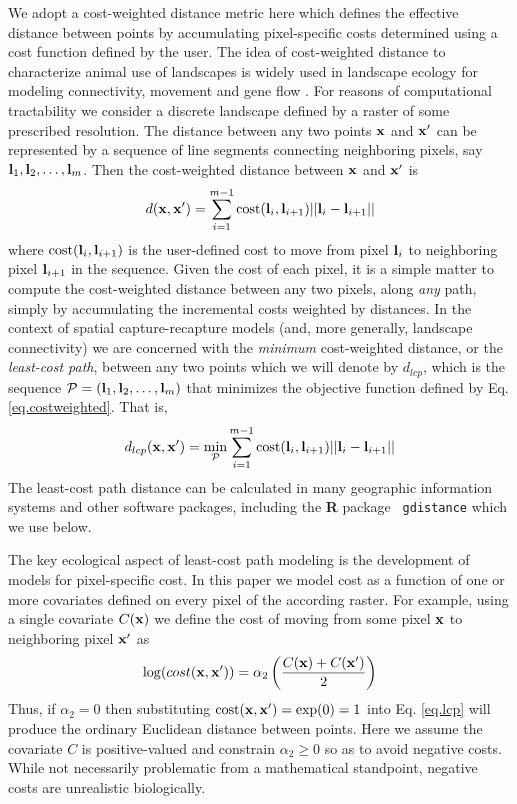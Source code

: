 We adopt a cost-weighted distance metric here which defines the
effective distance between points by accumulating pixel-specific costs
determined using a cost function defined by the user.  The idea of
cost-weighted distance to characterize animal use of landscapes is
widely used in landscape ecology for modeling connectivity, movement
and gene flow \citep{beier_etal:2008}. For reasons of computational
tractability we consider a discrete landscape defined by a raster of
some prescribed resolution. The distance between any two points ${\bf
  x}$ and ${\bf x}'$ can be represented by a sequence of line segments
connecting neighboring pixels, say ${\bf l}_{1},{\bf
  l}_{2},\ldots,{\bf l}_{m}$. Then the cost-weighted distance between
${\bf x}$ and ${\bf x}'$ is
\begin{equation}
 d({\bf x},{\bf x}')
  =  \sum_{i=1}^{m-1} \mbox{cost}({\bf l}_{i},{\bf l}_{i+1})||{\bf l}_{i} - {\bf l}_{i+1}||
\label{eq.costweighted}
\end{equation}
where $\mbox{cost}({\bf l}_{i},{\bf l}_{i+1})$ is the user-defined cost to
move from pixel ${\bf l}_{i}$ to neighboring pixel ${\bf l}_{i+1}$ in
the sequence.  Given the cost of each pixel, it is a simple matter to
compute the cost-weighted distance between any two pixels, along {\it
  any} path, simply by accumulating the incremental costs weighted by
distances.  In the context of spatial capture-recapture models (and,
more generally, landscape connectivity) we are concerned with the {\it
  minimum} cost-weighted distance, or the {\it least-cost path},
between any two points which we will denote by $d_{lcp}$, which is the
sequence ${\cal P} = ({\bf l}_{1},{\bf l}_{2},\ldots,{\bf l}_{m})$
that minimizes the objective function defined by
Eq. \ref{eq.costweighted}. That is,
\begin{equation}
 d_{lcp}({\bf x},{\bf x}')
  =  \min_{{\cal P}} \sum_{i=1}^{m-1} \mbox{cost}({\bf l}_{i},{\bf l}_{i+1})||{\bf l}_{i} - {\bf l}_{i+1}||
\label{eq.lcp}
\end{equation}
The least-cost path distance can be calculated in
 many geographic information systems and other software packages,
including the {\bf R} package \mbox{\tt
  gdistance} \citep{vanetten:2011} which we use below.

The key ecological aspect of least-cost path modeling is the
development
of models for pixel-specific cost.
In this paper we model cost as a function of one or more covariates
defined on every pixel of the according raster. For example, using a
single covariate $C({\bf x})$ we define the cost of moving from some pixel
${\bf x}$ to neighboring pixel ${\bf x}'$ as
\begin{equation}
\log(  cost({\bf x},{\bf x}'))=  \alpha_{2}\left( \frac{C({\bf
      x})+C({\bf x}')}{2}
\right)
\label{ecoldist.eq.cost}
\end{equation}
Thus, if $\alpha_{2} = 0$ then substituting $\mbox{cost}({\bf x},{\bf x}')
=\exp(0) = 1$ into
Eq. \ref{eq.lcp} will produce the ordinary Euclidean distance
between points. Here we assume the covariate $C$ is positive-valued
and constrain $\alpha_{2}\ge 0$ so as to avoid
negative costs. While not necessarily problematic from a mathematical
standpoint, negative costs are unrealistic biologically.

